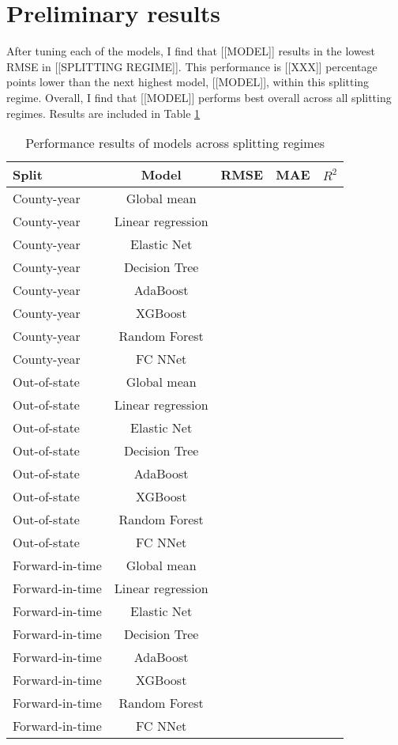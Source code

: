 \documentclass{article}
\begin{document}
\section{Preliminary results}

After tuning each of the models, I find that [[MODEL]] results in the lowest RMSE in [[SPLITTING REGIME]]. This performance is [[XXX]] percentage points lower than the next highest model, [[MODEL]], within this splitting regime. Overall, I find that [[MODEL]] performs best overall across all splitting regimes. Results are included in Table \ref{table:Performance results}

\begin{table}
  \begin{center}
  \begin{tabular}{|l|c|c|c|c|}
  \hline
  Split & Model & RMSE & MAE & $R^2$ \\
  \hline\hline
  County-year & Global mean &&& \\
  County-year & Linear regression &&& \\
  County-year & Elastic Net &&& \\
  County-year & Decision Tree &&& \\
  County-year & AdaBoost &&& \\
  County-year & XGBoost &&& \\
  County-year & Random Forest &&& \\
  County-year & FC NNet &&&\\
  \hline
  Out-of-state & Global mean &&& \\
  Out-of-state & Linear regression &&& \\
  Out-of-state & Elastic Net &&& \\
  Out-of-state & Decision Tree &&& \\
  Out-of-state & AdaBoost &&& \\
  Out-of-state & XGBoost &&& \\
  Out-of-state & Random Forest &&& \\
  Out-of-state & FC NNet &&&\\
  \hline
  Forward-in-time & Global mean &&& \\
  Forward-in-time & Linear regression &&& \\
  Forward-in-time & Elastic Net &&& \\
  Forward-in-time & Decision Tree &&& \\
  Forward-in-time & AdaBoost &&& \\
  Forward-in-time & XGBoost &&& \\
  Forward-in-time & Random Forest &&& \\
  Forward-in-time & FC NNet &&&\\
  \hline
  \end{tabular}
  \end{center}
  \caption{Performance results of models across splitting regimes}
  \label{table:Performance results}
\end{table}
\end{document}
